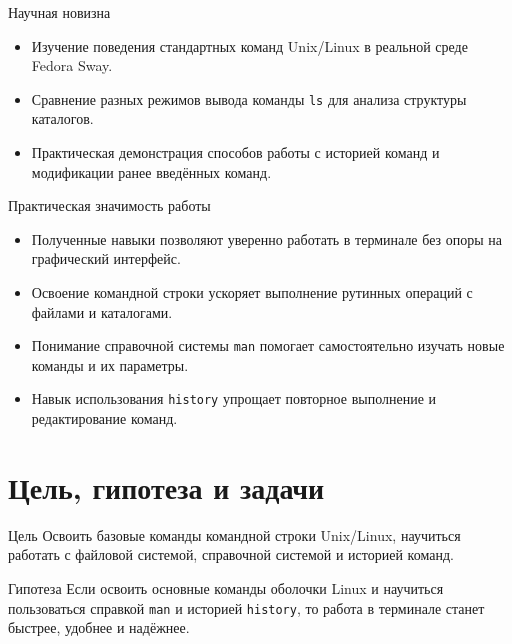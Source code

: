 \documentclass[
  ignorenonframetext,
  aspectratio=169,
  russian,
  aspectratio=169]{beamer}
\providecommand{\tightlist}{%
  \setlength{\itemsep}{0pt}\setlength{\parskip}{0pt}}
\begin{document}
\begin{frame}[fragile]{Научная новизна}
\protect{}\label{ux43dux430ux443ux447ux43dux430ux44f-ux43dux43eux432ux438ux437ux43dux430}
\begin{itemize}[<+->]
\tightlist
\item
  Изучение поведения стандартных команд Unix/Linux в реальной среде
  Fedora Sway.
\item
  Сравнение разных режимов вывода команды \texttt{ls} для анализа
  структуры каталогов.
\item
  Практическая демонстрация способов работы с историей команд и
  модификации ранее введённых команд.
\end{itemize}
\end{frame}

\begin{frame}[fragile]{Практическая значимость работы}
\protect{}\label{ux43fux440ux430ux43aux442ux438ux447ux435ux441ux43aux430ux44f-ux437ux43dux430ux447ux438ux43cux43eux441ux442ux44c-ux440ux430ux431ux43eux442ux44b}
\begin{itemize}[<+->]
\tightlist
\item
  Полученные навыки позволяют уверенно работать в терминале без опоры на
  графический интерфейс.
\item
  Освоение командной строки ускоряет выполнение рутинных операций с
  файлами и каталогами.
\item
  Понимание справочной системы \texttt{man} помогает самостоятельно
  изучать новые команды и их параметры.
\item
  Навык использования \texttt{history} упрощает повторное выполнение и
  редактирование команд.
\end{itemize}
\end{frame}

\section{Цель, гипотеза и
задачи}\label{ux446ux435ux43bux44c-ux433ux438ux43fux43eux442ux435ux437ux430-ux438-ux437ux430ux434ux430ux447ux438}

\begin{frame}{Цель}
\protect{}\label{ux446ux435ux43bux44c}
Освоить базовые команды командной строки Unix/Linux, научиться работать
с файловой системой, справочной системой и историей команд.
\end{frame}

\begin{frame}[fragile]{Гипотеза}
\protect{}\label{ux433ux438ux43fux43eux442ux435ux437ux430}
Если освоить основные команды оболочки Linux и научиться пользоваться
справкой \texttt{man} и историей \texttt{history}, то работа в терминале
станет быстрее, удобнее и надёжнее.
\end{frame}
\end{document}
